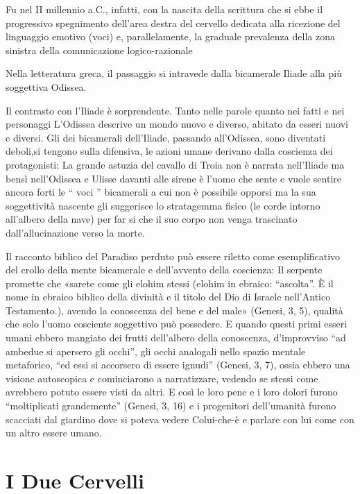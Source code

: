 Fu nel II millennio a.C., infatti, con la nascita della scrittura che si ebbe
il progressivo spegnimento dell’area destra del cervello dedicata alla ricezione
del  linguaggio emotivo (voci) e, parallelamente, la graduale prevalenza della
zona sinistra della comunicazione logico-razionale

Nella  letteratura greca, il passaggio si intravede  dalla bicamerale Iliade
alla più soggettiva  Odissea.

Il contrasto con l’Iliade è sorprendente. Tanto nelle parole quanto nei fatti e
nei personaggi L’Odissea descrive un mondo nuovo e diverso, abitato da esseri
nuovi e diversi. Gli dei bicamerali dell’Iliade, passando all’Odissea, sono
diventati deboli,si tengono sulla difensiva, le azioni umane derivano dalla
coscienza dei protagonisti: La grande astuzia del cavallo di Troia non è narrata
nell’Iliade  ma bensì nell’Odissea e Ulisse davanti alle sirene è l’uomo che
sente e vuole sentire ancora forti le “ voci ” bicamerali a cui non è possibile
opporsi ma la sua soggettività nascente gli suggerisce lo stratagemma fisico
(le corde intorno all’albero della nave) per far si che il suo corpo non venga
trascinato dall’allucinazione verso la morte.

Il racconto biblico del Paradiso perduto può essere riletto come esemplificativo
del crollo della mente bicamerale e dell'avvento della coscienza: Il serpente
promette che «sarete come gli elohim stessi (elohim in ebraico: “‎ascolta”. È il
nome in ebraico biblico della divinità e il titolo del Dio di Israele nell'Antico
Testamento.), avendo la conoscenza del bene e del male» (Genesi, 3, 5), qualità
che solo l'uomo cosciente soggettivo può possedere. E quando questi primi esseri
umani ebbero mangiato dei frutti dell'albero della conoscenza, d'improvviso “ad
ambedue si apersero gli occhi”, gli occhi analogali nello spazio mentale
metaforico, “ed essi si accorsero di essere ignudi” (Genesi, 3, 7), ossia ebbero
una visione autoscopica e cominciarono a narratizzare, vedendo se stessi come
avrebbero potuto essere visti da altri.  E così le loro pene e i loro dolori
furono “moltiplicati grandemente” (Genesi, 3, 16) e i progenitori dell'umanità
furono scacciati dal giardino dove si poteva vedere Colui-che-è e parlare con lui
come con un altro essere umano.

\section{I Due Cervelli}

